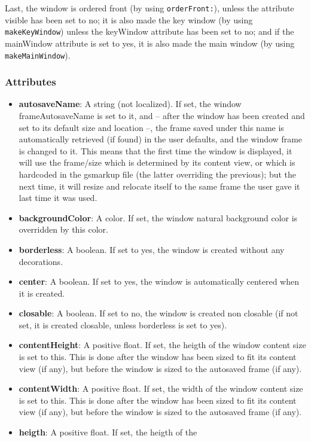 Last, the window is ordered front (by using \texttt{orderFront:}),
unless the attribute visible has been set to no; it is also made the
key window (by using \texttt{makeKeyWindow}) unless the keyWindow
attribute has been set to no; and if the mainWindow attribute is set
to yes, it is also made the main window (by using
\texttt{makeMainWindow}).

\subsubsection{Attributes}
\begin{itemize}
\item {\bf autosaveName}: A string (not localized).  If set, the
  window frameAutosaveName is set to it, and -- after the window has
  been created and set to its default size and location --, the frame
  saved under this name is automatically retrieved (if found) in the
  user defaults, and the window frame is changed to it.  This means
  that the first time the window is displayed, it will use the
  frame/size which is determined by its content view, or which is
  hardcoded in the gsmarkup file (the latter overriding the previous);
  but the next time, it will resize and relocate itself to the same
  frame the user gave it last time it was used.
\item {\bf backgroundColor}: A color.  If set, the window natural
  background color is overridden by this color.
\item {\bf borderless}: A boolean.  If set to yes, the window is
  created without any decorations.
\item {\bf center}: A boolean.  If set to yes, the window is
  automatically centered when it is created.
\item {\bf closable}: A boolean.  If set to no, the window is created
  non closable (if not set, it is created closable, unless borderless
  is set to yes).
\item {\bf contentHeight}: A positive float.  If set, the heigth of
  the window content size is set to this.  This is done after the
  window has been sized to fit its content view (if any), but before
  the window is sized to the autosaved frame (if any).
\item {\bf contentWidth}: A positive float.  If set, the width of the
  window content size is set to this.  This is done after the window
  has been sized to fit its content view (if any), but before the
  window is sized to the autosaved frame (if any).
\item {\bf heigth}: A positive float.  If set, the heigth of the

\end{itemize}

